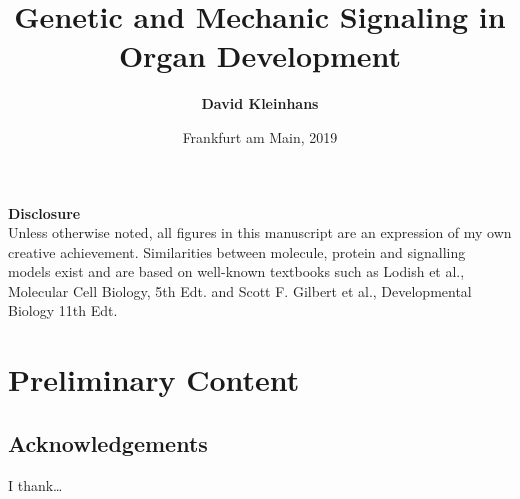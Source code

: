 \documentclass[11pt,singlespacinge,twoside]{reedthesis} %
\title{\textbf{Genetic and Mechanic Signaling in Organ Development}}
\author{\textbf{David Kleinhans}}
\date{Frankfurt am Main, 2019}
\theoremstyle{definition}
\theoremstyle{definition}
\theoremstyle{definition}
\theoremstyle{remark}
\begin{document}

  \maketitle

\frontmatter
{}
\pagestyle{empty} %


  \setcounter{tocdepth}{3}
  \tableofcontents

  \listoftables

  \listoffigures
  \vfill
  \begin{center}
    \textbf{Disclosure}\\
    {Unless otherwise noted, all figures in this manuscript are an expression of my own creative achievement. Similarities between molecule, protein and signalling models exist and are based on well-known textbooks such as Lodish et al., Molecular Cell Biology, 5th Edt. and Scott F. Gilbert et al., Developmental Biology 11th Edt.}
  \end{center}

\mainmatter %
\pagestyle{fancyplain} %

\hypertarget{preliminary-content}{%
\chapter*{Preliminary Content}\label{preliminary-content}}

\hypertarget{acknowledgements}{%
\section*{Acknowledgements}\label{acknowledgements}}

\vspace{1cm}

I thank\ldots{}\newline
\end{document}
